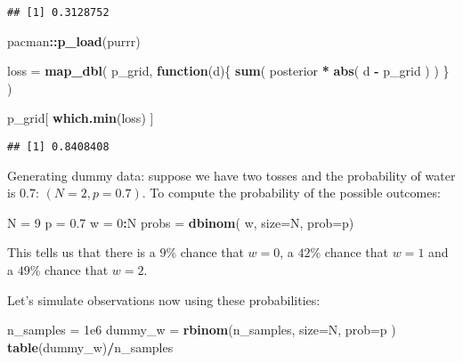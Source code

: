 \documentclass[
]{book}
\newenvironment{Shaded}{\begin{snugshade}}{\end{snugshade}}
\newcommand{\ControlFlowTok}[1]{\textcolor[rgb]{0.13,0.29,0.53}{\textbf{#1}}}
\newcommand{\DataTypeTok}[1]{\textcolor[rgb]{0.13,0.29,0.53}{#1}}
\newcommand{\DecValTok}[1]{\textcolor[rgb]{0.00,0.00,0.81}{#1}}
\newcommand{\FloatTok}[1]{\textcolor[rgb]{0.00,0.00,0.81}{#1}}
\newcommand{\KeywordTok}[1]{\textcolor[rgb]{0.13,0.29,0.53}{\textbf{#1}}}
\newcommand{\NormalTok}[1]{#1}
\newcommand{\OperatorTok}[1]{\textcolor[rgb]{0.81,0.36,0.00}{\textbf{#1}}}
\newcommand{\StringTok}[1]{\textcolor[rgb]{0.31,0.60,0.02}{#1}}
\begin{document}
\begin{verbatim}
## [1] 0.3128752
\end{verbatim}

\begin{Shaded}
\begin{Highlighting}[]
\NormalTok{pacman}\OperatorTok{::}\KeywordTok{p_load}\NormalTok{(purrr)}

\NormalTok{loss =}\StringTok{ }\KeywordTok{map_dbl}\NormalTok{( }
\NormalTok{    p_grid, }
    \ControlFlowTok{function}\NormalTok{(d)\{ }\KeywordTok{sum}\NormalTok{( posterior }\OperatorTok{*}\StringTok{ }\KeywordTok{abs}\NormalTok{( d }\OperatorTok{-}\StringTok{ }\NormalTok{p_grid ) ) \} )}

\NormalTok{p_grid[ }\KeywordTok{which.min}\NormalTok{(loss) ]}
\end{Highlighting}
\end{Shaded}

\begin{verbatim}
## [1] 0.8408408
\end{verbatim}

Generating dummy data: suppose we have two tosses and the probability of water is 0.7: \((N=2, p = 0.7)\). To compute the probability of the possible outcomes:

\begin{Shaded}
\begin{Highlighting}[]
\NormalTok{N =}\StringTok{ }\DecValTok{9}
\NormalTok{p =}\StringTok{ }\FloatTok{0.7}
\NormalTok{w =}\StringTok{ }\DecValTok{0}\OperatorTok{:}\NormalTok{N}
\NormalTok{probs =}\StringTok{ }\KeywordTok{dbinom}\NormalTok{( w, }\DataTypeTok{size=}\NormalTok{N, }\DataTypeTok{prob=}\NormalTok{p)}
\end{Highlighting}
\end{Shaded}

This tells us that there is a \(9\%\) chance that \(w=0\), a \(42\%\) chance that \(w=1\) and a \(49\%\) chance that \(w=2\).

Let's simulate observations now using these probabilities:

\begin{Shaded}
\begin{Highlighting}[]
\NormalTok{n_samples =}\StringTok{ }\FloatTok{1e6}
\NormalTok{dummy_w =}\StringTok{ }\KeywordTok{rbinom}\NormalTok{(n_samples, }\DataTypeTok{size=}\NormalTok{N, }\DataTypeTok{prob=}\NormalTok{p )}
\KeywordTok{table}\NormalTok{(dummy_w)}\OperatorTok{/}\NormalTok{n_samples}
\end{Highlighting}
\end{Shaded}
\end{document}
